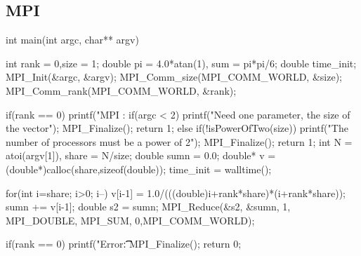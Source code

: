 \documentclass[11pt,a4paper,english]{article}
\begin{document}
\subsection*{MPI}
\begin{ccode}
int main(int argc, char** argv){
    int rank = 0,size = 1;
    double pi = 4.0*atan(1), sum = pi*pi/6;
    double time_init;
    MPI_Init(&argc, &argv);
    MPI_Comm_size(MPI_COMM_WORLD, &size);
    MPI_Comm_rank(MPI_COMM_WORLD, &rank);

    if(rank == 0){
        printf("MPI   \tThreadcount: %
        if(argc < 2) {
            printf("Need one parameter, the size of the vector\n");
            MPI_Finalize();
            return 1;
        }else if(!isPowerOfTwo(size)){
            printf("The number of processors must be a power of 2");
            MPI_Finalize();
            return 1;
        }
    }
    int N = atoi(argv[1]), share = N/size;
    double sumn = 0.0;
    double* v = (double*)calloc(share,sizeof(double));
    time_init = walltime();

    for(int i=share; i>0; i--){
        v[i-1] = 1.0/(((double)i+rank*share)*(i+rank*share));
        sumn += v[i-1];
    }
    double s2 = sumn;
    MPI_Reduce(&s2, &sumn, 1, MPI_DOUBLE, MPI_SUM, 0,MPI_COMM_WORLD);

    if(rank == 0){
        printf("Error:\t\t%
    }
    MPI_Finalize();
    return 0;
}
\end{ccode}
\end{document}
